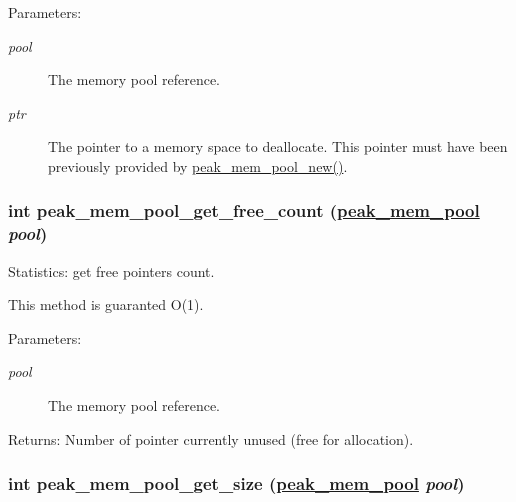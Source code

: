 \begin{Desc}
\item[Parameters:]
\begin{description}
\item[{\em pool}]The memory pool reference. \item[{\em ptr}]The pointer to a memory space to deallocate. This pointer must have been previously provided by \hyperlink{group__mem__pool_ga9}{peak\_\-mem\_\-pool\_\-new()}. \end{description}
\end{Desc}
\hypertarget{group__mem__pool_ga5}{
\subsubsection[peak\_\-mem\_\-pool\_\-get\_\-free\_\-count]{\setlength{\rightskip}{0pt plus 5cm}int peak\_\-mem\_\-pool\_\-get\_\-free\_\-count (\hyperlink{group__mem__pool_ga0}{peak\_\-mem\_\-pool} {\em pool})}}
\label{group__mem__pool_ga5}


Statistics: get free pointers count. 

This method is guaranted O(1).

\begin{Desc}
\item[Parameters:]
\begin{description}
\item[{\em pool}]The memory pool reference.\end{description}
\end{Desc}
\begin{Desc}
\item[Returns:]Number of pointer currently unused (free for allocation). \end{Desc}
\hypertarget{group__mem__pool_ga6}{
\subsubsection[peak\_\-mem\_\-pool\_\-get\_\-size]{\setlength{\rightskip}{0pt plus 5cm}int peak\_\-mem\_\-pool\_\-get\_\-size (\hyperlink{group__mem__pool_ga0}{peak\_\-mem\_\-pool} {\em pool})}}
\label{group__mem__pool_ga6}


